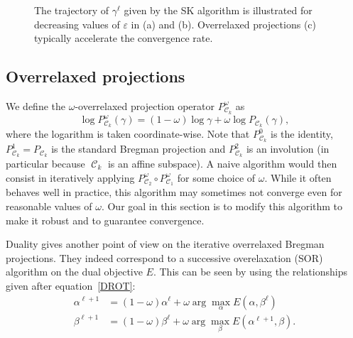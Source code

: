 \documentclass{article} %
\DeclareMathOperator{\Ccal}{\mathcal{C}}
\renewcommand{\epsilon}{\varepsilon}
\theoremstyle{plain}
\theoremstyle{definition}
\theoremstyle{remark}
\begin{document}
\begin{figure}[ht!]
\centering
\begin{minipage}[b]{.33\linewidth}
   \centering
   
                    \subcaption{}\label{fig:schema_a}
\end{minipage}%
\begin{minipage}[b]{.33\linewidth}
   \centering
   
                    \subcaption{}\label{fig:schema_b}
\end{minipage}%
\begin{minipage}[b]{.33\linewidth}
   \centering
   
                    \subcaption{}\label{fig:schema_c}
\end{minipage}%
\caption{\label{alternate_projections} The trajectory of $\gamma^{\ell}$ given by the SK algorithm is illustrated for decreasing values of $\epsilon$ in (a) and (b). Overrelaxed projections (c) typically accelerate the convergence rate.}
\end{figure}


\subsection{Overrelaxed projections}

We define the $\omega$-overrelaxed projection operator $P^\omega_{\Ccal_k}$ as
\begin{equation}\label{eq:def_or_proj}
\log P^\omega_{\Ccal_k}(\gamma) = (1-\omega) \log \gamma + \omega \log P_{\Ccal_k}(\gamma),
\end{equation}
where the logarithm is taken coordinate-wise.
Note that $P_{\Ccal_k}^0$ is the identity, $P_{\Ccal_k}^1 = P_{\Ccal_k}$ is the standard Bregman projection and $P_{\Ccal_k}^2$ is an involution (in particular because $\Ccal_k$ is an affine subspace).
A naive algorithm would then consist in iteratively applying $P^\omega_{\Ccal_2}\circ P^\omega_{\Ccal_1}$ for some choice of $\omega$.
While it often behaves well in practice, this algorithm may sometimes not converge even for reasonable values of $\omega$.
Our goal in this section is to modify this algorithm to make it robust and to guarantee convergence.

Duality gives another point of view on the iterative overrelaxed Bregman projections. They indeed correspond to a successive overelaxation (SOR) algorithm on the dual objective $E$. This can be seen by using the relationships given after equation~\eqref{DROT}:
\begin{align}\label{SORdual}
\alpha^{\ell+1} &= (1-\omega)\alpha^{\ell} + \omega \arg \max_\alpha E(\alpha,\beta^{\ell})\\
\beta^{\ell + 1}&=(1-\omega) \beta^{\ell} + \omega \arg \max_\beta E(\alpha^{\ell+1},\beta).
\end{align} 
\end{document}
